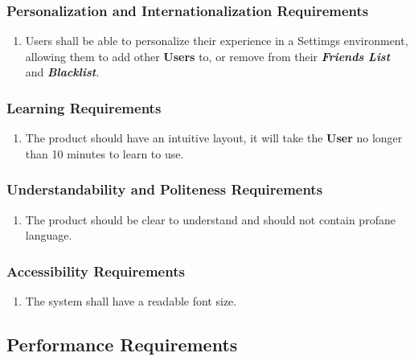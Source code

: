 \documentclass[english]{article}
\begin{document}
\subsubsection{Personalization and Internationalization Requirements}
\label{ssub:personalization_and_internationalization_requirements}
\begin{enumerate}[{PIR}1. ]
	\item Users shall be able to personalize their experience in a Settimgs environment, allowing them to add other \textbf{Users} to, or remove from their \textbf{\emph{Friends List}} and \textbf{\emph{Blacklist}}.
\end{enumerate}

\subsubsection{Learning Requirements}
\label{ssub:learning_requirements}
\begin{enumerate}[{LR}1. ]
	\item The product should have an intuitive layout, it will take the \textbf{User} no longer than 10 minutes to learn to use. 
\end{enumerate}

\subsubsection{Understandability and Politeness Requirements}
\label{ssub:understandability_and_politeness_requirements}
\begin{enumerate}[{UPR}1. ]
	\item The product should be clear to understand and should not contain profane language. 
\end{enumerate}

\subsubsection{Accessibility Requirements}
\label{ssub:accessibility_requirements}
\begin{enumerate}[{ACR}1. ]
	\item The system shall have a readable font size.
\end{enumerate}


\subsection{Performance Requirements}
\label{sub:performance_requirements}
\end{document}
